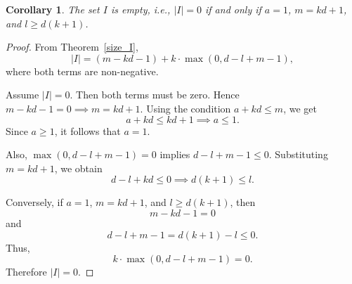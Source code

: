 \documentclass[10pt,a4paper]{amsart}
\newtheorem{corollary}{Corollary}
\begin{document}
\begin{corollary}
The set $I$ is empty, i.e., $|I|=0$ if and only if 
$a=1$, $m=kd+1$, and $l\ge d(k+1)$.
\end{corollary}

\begin{proof}
From Theorem~\ref{size_I},
$$
|I|=(m-kd-1)+k\cdot \max(0,d-l+m-1),
$$
where both terms are non-negative.

Assume $|I|=0$. Then both terms must be zero. Hence
$
m-kd-1=0 \implies m=kd+1.
$
Using the condition $a+kd\le m$, we get
\[
a+kd\le kd+1 \implies a\le 1.
\]
Since $a\ge 1$, it follows that $a=1$.

Also,
$
\max(0,d-l+m-1)=0
$ implies
$
d-l+m-1\le 0.
$
Substituting $m=kd+1$, we obtain
\[
d-l+kd\le 0
\implies d(k+1)\le l.
\]

Conversely, if $a=1$, $m=kd+1$, and $l\ge d(k+1)$, then
\[
m-kd-1=0
\]
and
\[
d-l+m-1=d(k+1)-l\le 0.
\]
Thus,
\[
k\cdot \max(0,d-l+m-1)=0.
\]
Therefore $|I|=0$.
\end{proof}
\end{document}
